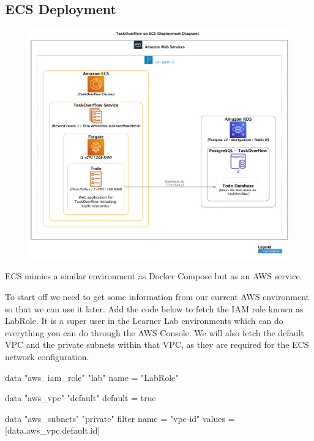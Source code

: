\documentclass{csse4400}
\begin{document}
\subsection{ECS Deployment}
\label{pathb}

\begin{figure}[H]
  \includegraphics[trim=0 230 0 0,clip,width=\textwidth]{diagrams/ecsdeployment}
\end{figure}

ECS mimics a similar environment as Docker Compose but as an AWS service.

To start off we need to get some information from our current AWS environment so that we can use it later.
Add the code below to fetch the IAM role known as LabRole.
It is a super user in the Learner Lab environments which can do everything you can do through the AWS Console.
We will also fetch the default VPC and the private subnets within that VPC,
 as they are required for the ECS network configuration.

\begin{code}[language=terraform,numbers=none]{}
data "aws_iam_role" "lab" {
    name = "LabRole"
}

data "aws_vpc" "default" {
    default = true
}

data "aws_subnets" "private" {
    filter {
        name   = "vpc-id"
        values = [data.aws_vpc.default.id]
    }
}
\end{code}
\end{document}
